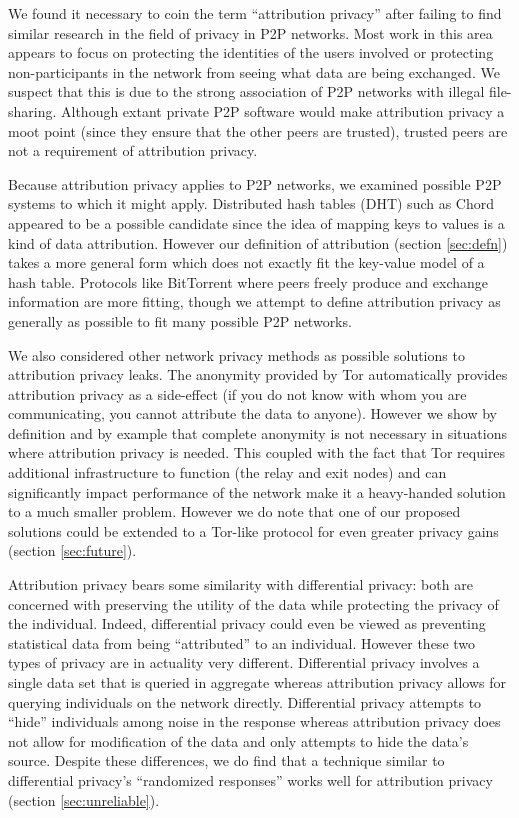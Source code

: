 \documentclass{article}
\newcommand{\secref}[1]{section \ref{sec:#1}}
\begin{document}
We found it necessary to coin the term ``attribution privacy'' after failing to
find similar research in the field of privacy in P2P networks. Most work in this
area appears to focus on protecting the identities of the users involved or
protecting non-participants in the network from seeing what data are being
exchanged\cite{privatep2p}. We suspect that this is due to the strong
association of P2P networks with illegal file-sharing. Although extant private
P2P software would make attribution privacy a moot point (since they ensure that
the other peers are trusted), trusted peers are not a requirement of attribution
privacy.

Because attribution privacy applies to P2P networks, we examined possible P2P
systems to which it might apply. Distributed hash tables (DHT) such as
Chord\cite{chord} appeared to be a possible candidate since the idea of mapping
keys to values is a kind of data attribution. However our definition of
attribution (\secref{defn}) takes a more general form which does not exactly
fit the key-value model of a hash table. Protocols like BitTorrent where peers
freely produce and exchange information are more fitting, though we attempt to
define attribution privacy as generally as possible to fit many possible
P2P networks.

We also considered other network privacy methods as possible solutions to
attribution privacy leaks. The anonymity provided by Tor
automatically provides attribution privacy as a side-effect (if you do not know
with whom you are communicating, you cannot attribute the data to anyone).
However we show by definition and by example that complete anonymity is not
necessary in situations where attribution privacy is needed. This coupled with
the fact that Tor requires additional infrastructure to function (the relay and
exit nodes) and can significantly impact performance of the network make it a
heavy-handed solution to a much smaller problem. However we do note that one of
our proposed solutions could be extended to a Tor-like protocol for even greater
privacy gains (\secref{future}).

Attribution privacy bears some similarity with differential privacy\cite{randresps}: both
are concerned with preserving the utility of the data while protecting the
privacy of the individual. Indeed, differential privacy could even be viewed as
preventing statistical data from being ``attributed'' to an individual. However
these two types of privacy are in actuality very different. Differential
privacy involves a single data set that is queried in aggregate whereas attribution
privacy allows for querying individuals on the network directly. Differential
privacy attempts to ``hide'' individuals among noise in the response whereas
attribution privacy does not allow for modification of the data and only
attempts to hide the data's source. Despite these differences, we do find that a
technique similar to differential privacy's ``randomized
responses'' works well
for attribution privacy (\secref{unreliable}).
\end{document}
